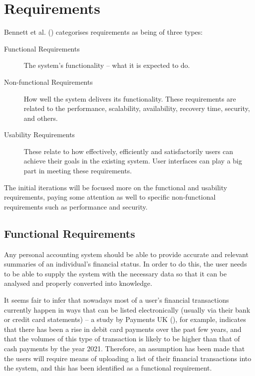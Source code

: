 \section{Requirements} \label{sec:Requirements}
Bennett et al. (\citeyear[][pp.~140-142]{bennett2010object}) categorises
requirements as being of three types:

\begin{description} \item[Functional Requirements]
    The system's functionality -- what it is expected to do.
    
  \item[Non-functional Requirements]
    How well the system delivers its functionality. These requirements are
    related to the performance, scalability, availability, recovery time,
    security, and others.

  \item[Usability Requirements]
    These relate to how effectively, efficiently and satisfactorily users can
    achieve their goals in the existing system. User interfaces can play a big
    part in meeting these requirements.
\end{description}

The initial iterations will be focused more on the functional and usability
requirements, paying some attention as well to specific non-functional
requirements such as performance and security.


\subsection{Functional Requirements} \label{sec:Requirements.FunctionalRequirements}
Any personal accounting system should be able to provide accurate and relevant
summaries of an individual's financial status. In order to do this, the user
needs to be able to supply the system with the necessary data so that it can be
analysed and properly converted into knowledge.

It seems fair to infer that nowadays most of a user's financial transactions
currently happen in ways that can be listed electronically (usually via their
bank or credit card statements) -- a study by Payments UK
(\citeyear{paymentsUK2017summary}), for example, indicates that there has been
a rise in debit card payments over the past few years, and that the volumes of
this type of transaction is likely to be higher than that of cash payments by
the year 2021. Therefore, an assumption has been made that the users will
require means of uploading a list of their financial transactions into the
system, and this has been identified as a functional requirement.

